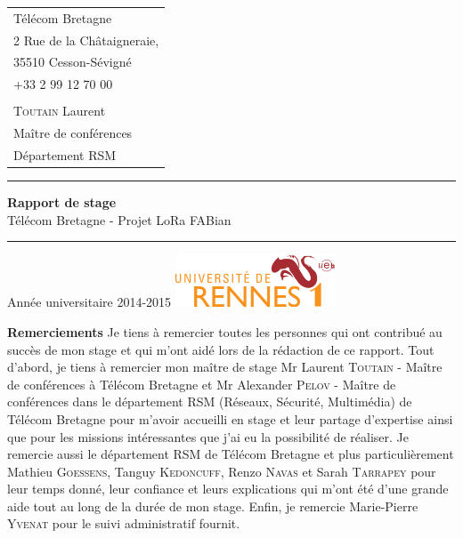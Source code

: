 \documentclass{article}
\begin{document}
\begin{titlepage}
\begin{tabular}{l}
		Télécom Bretagne\\
		2 Rue de la Châtaigneraie,\\
		35510 Cesson-Sévigné\\
		+33 2 99 12 70 00\\
		\\
		\textsc{Toutain} Laurent\\
		Maître de conférences\\
		Département RSM
	\end{tabular}
	\vfill
	\begin{center}
		\vspace{0.5cm}\hrule\vspace{0.5cm}
		\LARGE{\textbf{Rapport de stage}}\\
		\Large{Télécom Bretagne - Projet LoRa FABian}
		\vspace{0.5cm}\hrule
	\end{center}
	\vfill
	\begin{flushleft}
		\Large{Année universitaire 2014-2015}
		\hspace{4cm}
		\includegraphics[scale=0.6]{univ}
	\end{flushleft}
\end{titlepage}
\begin{titlepage}
\textbf{Remerciements}
\newline\newline
Je tiens à remercier toutes les personnes qui ont contribué au succès de mon stage et qui m'ont aidé lors de la rédaction de ce rapport.
\newline\newline
Tout d'abord, je tiens à remercier mon maître de stage Mr Laurent \textsc{Toutain} - Maître de conférences à Télécom Bretagne et Mr Alexander \textsc{Pelov} - Maître de conférences dans le département RSM (Réseaux, Sécurité, Multimédia) de Télécom Bretagne pour m'avoir accueilli en stage et leur partage d'expertise ainsi que pour les missions intéressantes que j'ai eu la possibilité de réaliser.
\newline\newline
Je remercie aussi le département RSM de Télécom Bretagne et plus particulièrement Mathieu \textsc{Goessens}, Tanguy \textsc{Kedoncuff}, Renzo \textsc{Navas} et Sarah \textsc{Tarrapey} pour leur temps donné, leur confiance et leurs explications qui m'ont été d'une grande aide tout au long de la durée de mon stage.
\newline\newline
Enfin, je remercie Marie-Pierre \textsc{Yvenat} pour le suivi administratif fournit.
\end{titlepage}
\end{document}
